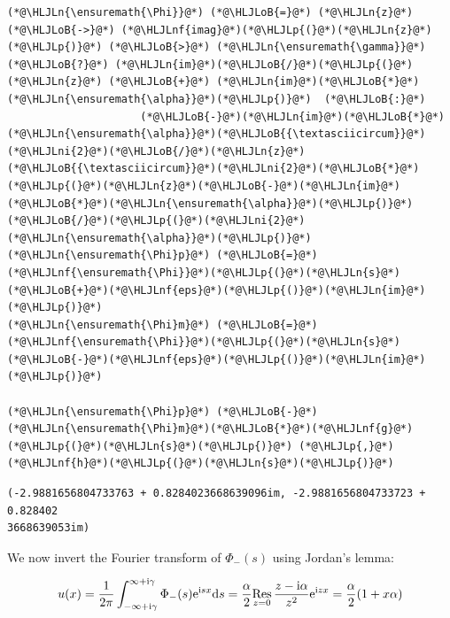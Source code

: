 \documentclass[12pt,a4paper]{article}
\newcommand{\HLJLn}[1]{#1}
\newcommand{\HLJLnf}[1]{\textcolor[RGB]{66,102,213}{#1}}
\newcommand{\HLJLni}[1]{\textcolor[RGB]{59,151,46}{#1}}
\newcommand{\HLJLoB}[1]{\textcolor[RGB]{102,102,102}{\textbf{#1}}}
\newcommand{\HLJLp}[1]{#1}
\def\D{ {\rm d} }
\def\I{ {\rm i} }
\def\E{ {\rm e} }
\def\Res_#1{\underset{#1}{\rm Res}\,}
\begin{document}
\begin{lstlisting}
(*@\HLJLn{\ensuremath{\Phi}}@*) (*@\HLJLoB{=}@*) (*@\HLJLn{z}@*) (*@\HLJLoB{->}@*) (*@\HLJLnf{imag}@*)(*@\HLJLp{(}@*)(*@\HLJLn{z}@*)(*@\HLJLp{)}@*) (*@\HLJLoB{>}@*) (*@\HLJLn{\ensuremath{\gamma}}@*) (*@\HLJLoB{?}@*) (*@\HLJLn{im}@*)(*@\HLJLoB{/}@*)(*@\HLJLp{(}@*)(*@\HLJLn{z}@*) (*@\HLJLoB{+}@*) (*@\HLJLn{im}@*)(*@\HLJLoB{*}@*)(*@\HLJLn{\ensuremath{\alpha}}@*)(*@\HLJLp{)}@*)  (*@\HLJLoB{:}@*)
                     (*@\HLJLoB{-}@*)(*@\HLJLn{im}@*)(*@\HLJLoB{*}@*)(*@\HLJLn{\ensuremath{\alpha}}@*)(*@\HLJLoB{{\textasciicircum}}@*)(*@\HLJLni{2}@*)(*@\HLJLoB{/}@*)(*@\HLJLn{z}@*)(*@\HLJLoB{{\textasciicircum}}@*)(*@\HLJLni{2}@*)(*@\HLJLoB{*}@*) (*@\HLJLp{(}@*)(*@\HLJLn{z}@*)(*@\HLJLoB{-}@*)(*@\HLJLn{im}@*)(*@\HLJLoB{*}@*)(*@\HLJLn{\ensuremath{\alpha}}@*)(*@\HLJLp{)}@*)(*@\HLJLoB{/}@*)(*@\HLJLp{(}@*)(*@\HLJLni{2}@*)(*@\HLJLn{\ensuremath{\alpha}}@*)(*@\HLJLp{)}@*)
(*@\HLJLn{\ensuremath{\Phi}p}@*) (*@\HLJLoB{=}@*) (*@\HLJLnf{\ensuremath{\Phi}}@*)(*@\HLJLp{(}@*)(*@\HLJLn{s}@*)(*@\HLJLoB{+}@*)(*@\HLJLnf{eps}@*)(*@\HLJLp{()}@*)(*@\HLJLn{im}@*)(*@\HLJLp{)}@*) 
(*@\HLJLn{\ensuremath{\Phi}m}@*) (*@\HLJLoB{=}@*) (*@\HLJLnf{\ensuremath{\Phi}}@*)(*@\HLJLp{(}@*)(*@\HLJLn{s}@*)(*@\HLJLoB{-}@*)(*@\HLJLnf{eps}@*)(*@\HLJLp{()}@*)(*@\HLJLn{im}@*)(*@\HLJLp{)}@*) 

(*@\HLJLn{\ensuremath{\Phi}p}@*) (*@\HLJLoB{-}@*) (*@\HLJLn{\ensuremath{\Phi}m}@*)(*@\HLJLoB{*}@*)(*@\HLJLnf{g}@*)(*@\HLJLp{(}@*)(*@\HLJLn{s}@*)(*@\HLJLp{)}@*) (*@\HLJLp{,}@*) (*@\HLJLnf{h}@*)(*@\HLJLp{(}@*)(*@\HLJLn{s}@*)(*@\HLJLp{)}@*)
\end{lstlisting}

\begin{lstlisting}
(-2.9881656804733763 + 0.8284023668639096im, -2.9881656804733723 + 0.828402
3668639053im)
\end{lstlisting}


We now invert the Fourier transform of $\Phi_-(s)$ using Jordan's lemma:

\[
u(x) = {1 \over 2 \pi} \int_{-\infty + \I \gamma}^{\infty + \I \gamma} \Phi_-(s) \E^{\I s x} \D s = {\alpha \over 2}\Res_{z = 0} {z- \I \alpha \over z^2} \E^{\I z x}  = {\alpha \over 2} (1+x \alpha)
\]
\end{document}
